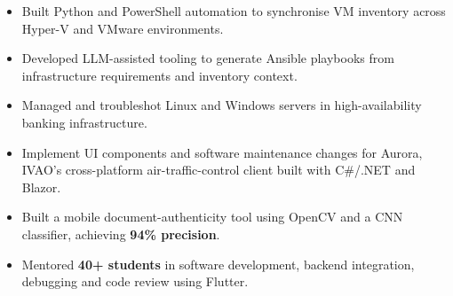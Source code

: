 
\begin{itemize}
  \item Built Python and PowerShell automation to synchronise VM inventory across Hyper-V and VMware environments.
  \item Developed LLM-assisted tooling to generate Ansible playbooks from infrastructure requirements and inventory context.
  \item Managed and troubleshot Linux and Windows servers in high-availability banking infrastructure.
\end{itemize}
\vspace{2pt}
\begin{itemize}
  \item Implement UI components and software maintenance changes for Aurora, IVAO's cross-platform air-traffic-control client built with C\#/.NET and Blazor.
\end{itemize}
\vspace{2pt}
\begin{itemize}
  \item Built a mobile document-authenticity tool using OpenCV and a CNN classifier, achieving \textbf{94\% precision}.
\end{itemize}
\vspace{2pt}
\begin{itemize}
  \item Mentored \textbf{40+ students} in software development, backend integration, debugging and code review using Flutter.
\end{itemize}

\providecommand{\cvprojects}{onepage_projects_infra}


